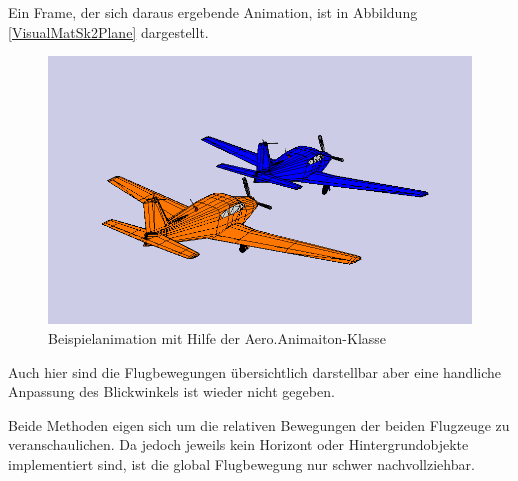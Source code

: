 Ein Frame, der sich daraus ergebende Animation, ist in Abbildung \ref{VisualMatSk2Plane} dargestellt.
\begin{figure}[h]
	\centering
	\includegraphics[width=\textwidth]{./Bilder/VisualMatSk2Plane.png}
	\caption{Beispielanimation mit Hilfe der Aero.Animaiton-Klasse}
	\label{fig:VisualMatSk2Plane}
\end{figure}
Auch hier sind die Flugbewegungen übersichtlich darstellbar aber eine handliche Anpassung des Blickwinkels ist wieder nicht gegeben.

Beide Methoden eigen sich um die relativen Bewegungen der beiden Flugzeuge zu veranschaulichen. 
Da jedoch jeweils kein Horizont oder Hintergrundobjekte implementiert sind, ist die global Flugbewegung nur schwer nachvollziehbar.



	

